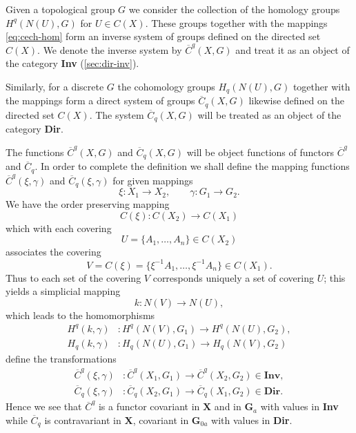 \documentclass[11pt,a4paper]{report}
\begin{document}
Given a topological group $G$ we consider the collection of the homology groups $H^q(N(U),G)$
for $U\in C(X)$. These groups together with the mappings \cref{eq:cech-hom} form an inverse
system of groups defined on the directed set $C(X)$. We denote the inverse system by $\overline{C}^q(X,G)$
and treat it as an object of the category \textbf{Inv} (\cref{sec:dir-inv}).

Similarly, for a discrete $G$ the cohomology groups $H_q(N(U),G)$ together with the mappings 
 form a direct system of groups $\overline{C}_q(X,G)$ likewise
defined on the directed set $C(X)$. The system $\overline{C}_q(X,G)$ will be treated as an 
object of the category \textbf{Dir}.

The functions $\overline{C}^q(X,G)$ and $\overline{C}_q(X,G)$ will be object functions of 
functors $\overline{C}^q$ and $\overline{C}_q$. In order to complete the definition we shall
define the mapping functions  $\overline{C}^q(\xi,\gamma)$ and $\overline{C}_q(\xi,\gamma)$ for
given mappings
\begin{equation*}
	\xi:X_1\rightarrow X_2,\qquad \gamma:G_1\rightarrow G_2.
\end{equation*}
We have the order preserving mapping
\begin{equation}\label{eq:cech-map1}
	C(\xi):C(X_2)\rightarrow C(X_1)
\end{equation}
which with each covering
\begin{equation*}
	U = \{A_1,\dotsc,A_n\}\in C(X_2)
\end{equation*}
associates the covering
\begin{equation*}
	V = C(\xi) = \{\xi^{-1}A_1,\dotsc,\xi^{-1}A_n\}\in C(X_1).
\end{equation*}
Thus to each set of the covering $V$ corresponds uniquely a set of covering $U$; this yields a 
simplicial mapping
\begin{equation*}
	k:N(V)\rightarrow N(U),
\end{equation*}
which leads to the homomorphisms
\begin{align}
	H^q(k,\gamma) &: H^q(N(V),G_1)\rightarrow H^q(N(U),G_2),\label{eq:cech-map2}\\
	H_q(k,\gamma) &: H_q(N(U),G_1)\rightarrow H_q(N(V),G_2)\label{eq:cech-map3}
\end{align}
 define the transformations
\begin{align*}
	\overline{C}^q(\xi,\gamma) &:\overline{C}^q(X_1,G_1)\rightarrow \overline{C}^q(X_2,G_2)\in\mathbf{Inv},\\
	\overline{C}_q(\xi,\gamma) &:\overline{C}_q(X_2,G_1)\rightarrow \overline{C}_q(X_1,G_2)\in\mathbf{Dir}.
\end{align*}
Hence we see that $\overline{C}^q$ is a functor covariant in $\mathbf{X}$ and in $\mathbf{G}_a$ with values in \textbf{Inv}
while $\overline{C}_q$ is contravariant in $\mathbf{X}$, covariant in $\mathbf{G}_{0a}$ with values in \textbf{Dir}.
\end{document}
